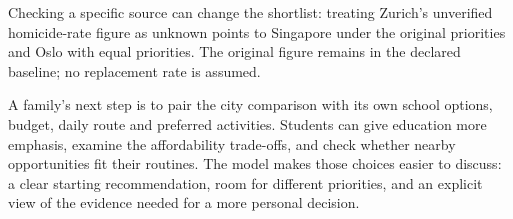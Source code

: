 Checking a specific source can change the shortlist: treating Zurich's unverified homicide-rate figure as unknown points to Singapore under the original priorities and Oslo with equal priorities. The original figure remains in the declared baseline; no replacement rate is assumed.

A family's next step is to pair the city comparison with its own school options, budget, daily route and preferred activities. Students can give education more emphasis, examine the affordability trade-offs, and check whether nearby opportunities fit their routines. The model makes those choices easier to discuss: a clear starting recommendation, room for different priorities, and an explicit view of the evidence needed for a more personal decision.
